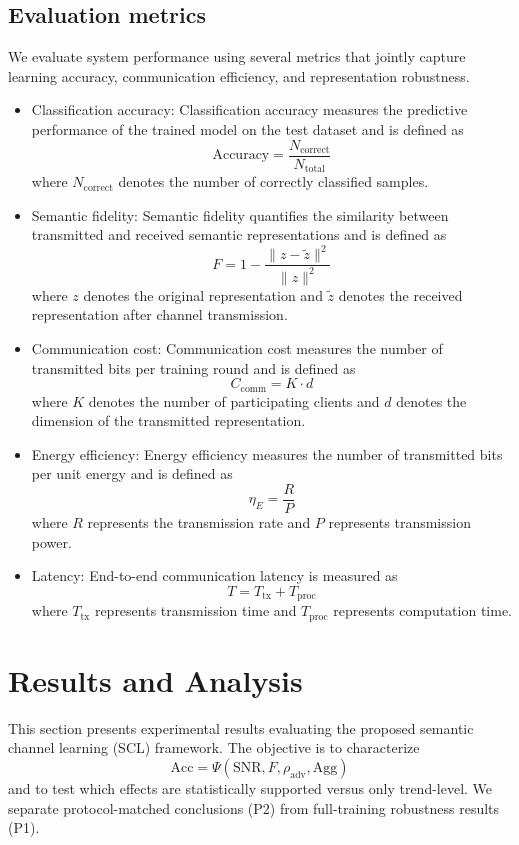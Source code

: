 \documentclass[10pt,journal]{IEEEtran}
\begin{document}
\subsection{Evaluation metrics}
We evaluate system performance using several metrics that jointly capture learning accuracy, communication efficiency, and representation robustness.
\begin{itemize}
    \item Classification accuracy: Classification accuracy measures the predictive performance of the trained model on the test dataset and is defined as
\begin{equation}
\text{Accuracy} = \frac{N_{\text{correct}}}{N_{\text{total}}}
\end{equation}
where $N_{\text{correct}}$ denotes the number of correctly classified samples.
\item Semantic fidelity: Semantic fidelity quantifies the similarity between transmitted and received semantic representations and is defined as
\begin{equation}
F = 1 - \frac{\|z-\tilde{z}\|^2}{\|z\|^2}
\end{equation}
where $z$ denotes the original representation and $\tilde{z}$ denotes the received representation after channel transmission.
\item Communication cost: Communication cost measures the number of transmitted bits per training round and is defined as
\begin{equation}
C_{\text{comm}} = K \cdot d
\end{equation}
where $K$ denotes the number of participating clients and $d$ denotes the dimension of the transmitted representation.
\item Energy efficiency: Energy efficiency measures the number of transmitted bits per unit energy and is defined as
\begin{equation}
\eta_E = \frac{R}{P}
\end{equation}
where $R$ represents the transmission rate and $P$ represents transmission power.
\item Latency: End-to-end communication latency is measured as
\begin{equation}
T = T_{\text{tx}} + T_{\text{proc}}
\end{equation}
where $T_{\text{tx}}$ represents transmission time and $T_{\text{proc}}$ represents computation time.
\end{itemize}
\section{Results and Analysis}
This section presents experimental results evaluating the proposed semantic channel learning (SCL) framework. The objective is to characterize
\begin{equation}
\mathrm{Acc}=\Psi(\mathrm{SNR},F,\rho_{\mathrm{adv}},\mathrm{Agg})
\end{equation}
and to test which effects are statistically supported versus only trend-level. We separate protocol-matched conclusions (P2) from full-training robustness results (P1).
\end{document}
